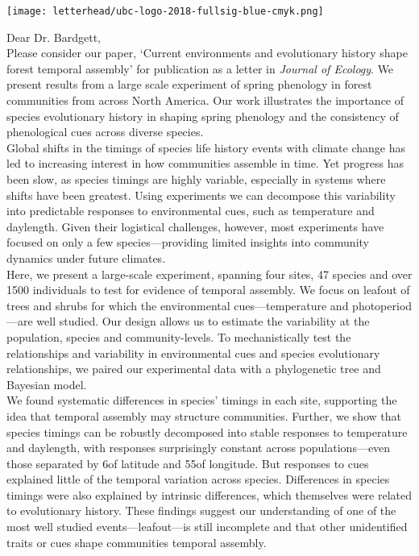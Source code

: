 \documentclass[11pt,a4paper]{article}
\begin{document}

\noindent \texttt{[image: letterhead/ubc-logo-2018-fullsig-blue-cmyk.png]}

\noindent Dear Dr. Bardgett,\\

\noindent Please consider our paper, `Current environments and evolutionary history shape forest temporal assembly' for publication as a letter in \emph{Journal of Ecology}. We present results from a large scale experiment of spring phenology in forest communities from across North America. Our work illustrates the importance of species evolutionary history in shaping spring phenology and the consistency of phenological cues across diverse species. 
\vspace{1.5ex}\\ 
Global shifts in the timings of species life history events with climate change has led to increasing interest in how communities assemble in time. Yet progress has been slow, as species timings are highly variable, especially in systems where shifts have been greatest. Using experiments we can decompose this variability into predictable responses to environmental cues, such as temperature and daylength. Given their logistical challenges, however, most experiments have focused on only a few species---providing limited insights into community dynamics under future climates. %
\vspace{1.5ex}\\
\noindent %
Here, we present a large-scale experiment, spanning four sites, 47 species and over 1500 individuals to test for evidence of temporal assembly.  We focus on leafout of trees and shrubs for which the environmental cues---temperature and photoperiod---are well studied. Our design allows us to estimate the variability at the population, species and community-levels. To mechanistically test the relationships and variability in environmental cues and species evolutionary relationships, we paired our experimental data with a phylogenetic tree and Bayesian model. 
\vspace{1.5 ex}\\
\noindent  We found systematic differences in species' timings in each site, supporting the idea that temporal assembly may structure communities. Further, we show that species timings can be robustly decomposed into stable responses to temperature and daylength, with responses surprisingly constant across populations---even those separated by 6\textdegree  of latitude and 55\textdegree  of longitude. But responses to cues explained little of the temporal variation across species. Differences in species timings were also explained by intrinsic differences, which themselves were related to evolutionary history. These findings suggest our understanding of one of the most well studied events---leafout---is still incomplete and that other unidentified traits or cues shape communities temporal assembly. 
\end{document}
